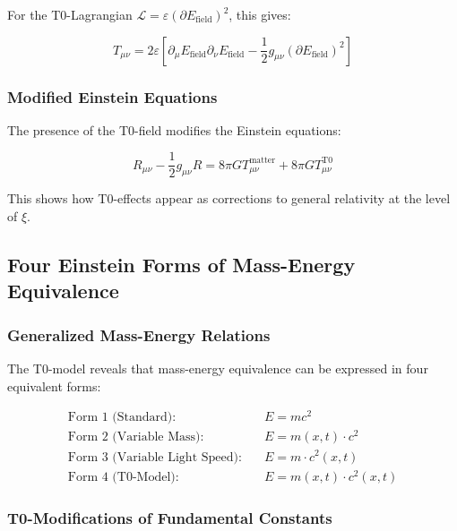 \documentclass[12pt,a4paper]{article}
\theoremstyle{definition}
\begin{document}
	For the T0-Lagrangian $\mathcal{L} = \varepsilon (\partial E_{\text{field}})^2$, this gives:
	
	\begin{equation}
		T_{\mu\nu} = 2\varepsilon \left[\partial_\mu E_{\text{field}} \partial_\nu E_{\text{field}} - \frac{1}{2}g_{\mu\nu}(\partial E_{\text{field}})^2\right]
	\end{equation}
	
	\subsubsection{Modified Einstein Equations}
	
	The presence of the T0-field modifies the Einstein equations:
	
	\begin{equation}
		\boxed{R_{\mu\nu} - \frac{1}{2}g_{\mu\nu}R = 8\pi G T_{\mu\nu}^{\text{matter}} + 8\pi G T_{\mu\nu}^{\text{T0}}}
	\end{equation}
	
	This shows how T0-effects appear as corrections to general relativity at the level of $\xi$.
	
	\subsection{Four Einstein Forms of Mass-Energy Equivalence}
	
	\subsubsection{Generalized Mass-Energy Relations}
	
	The T0-model reveals that mass-energy equivalence can be expressed in four equivalent forms:
	
	\begin{align}
		\text{Form 1 (Standard):} \quad & E = mc^2 \\
		\text{Form 2 (Variable Mass):} \quad & E = m(x,t) \cdot c^2 \\
		\text{Form 3 (Variable Light Speed):} \quad & E = m \cdot c^2(x,t) \\
		\text{Form 4 (T0-Model):} \quad & E = m(x,t) \cdot c^2(x,t)
	\end{align}
	
	\subsubsection{T0-Modifications of Fundamental Constants}
	
\end{document}
